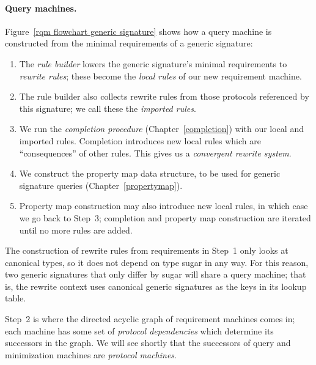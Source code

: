 \documentclass[../generics]{subfiles}
\begin{document}
\paragraph{Query machines.}
Figure~\ref{rqm flowchart generic signature} shows how a query machine is constructed from the minimal requirements of a generic signature:
\begin{enumerate}
\item The \emph{rule builder} lowers the generic signature's minimal requirements to \emph{rewrite rules}; these become the \emph{local rules} of our new requirement machine.

\item The rule builder also collects rewrite rules from those protocols referenced by this signature; we call these the \emph{imported rules}.

\item We run the \emph{completion procedure} (Chapter~\ref{completion}) with our local and imported rules. Completion introduces new local rules which are ``consequences'' of other rules. This gives us a \emph{convergent rewrite system}.

\item We construct the property map data structure, to be used for generic signature queries (Chapter~\ref{propertymap}). 

\item Property map construction may also introduce new local rules, in which case we go back to Step~3; completion and property map construction are iterated until no more rules are added.
\end{enumerate}

The construction of rewrite rules from requirements in Step~1 only looks at canonical types, so it does not depend on type sugar in any way. For this reason, two generic signatures that only differ by sugar will share a query machine; that is, the rewrite context uses canonical generic signatures as the keys in its lookup table.

Step~2 is where the directed acyclic graph of requirement machines comes in; each machine has some set of \emph{protocol dependencies} which determine its successors in the graph. We will see shortly that the successors of query and minimization machines are \emph{protocol machines}.
\end{document}
